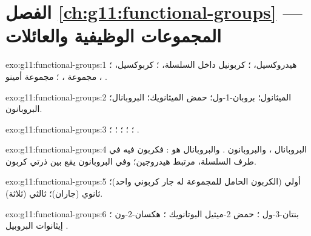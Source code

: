 \section*{الفصل \ref{ch:g11:functional-groups} --- المجموعات الوظيفية والعائلات}

\begin{solution}{exo:g11:functional-groups:1}
هيدروكسيل، ؛ كربونيل داخل السلسلة، ؛ كربوكسيل، ؛ مجموعة ، ؛ مجموعة أمينو ، .
\end{solution}

\begin{solution}{exo:g11:functional-groups:2}
الميثانول؛ بروبان-1-ول؛ حمض الميثانويك؛ البروبانال؛ البروبانون.
\end{solution}

\begin{solution}{exo:g11:functional-groups:3}
؛ ؛ ؛ ؛ ؛ .
\end{solution}

\begin{solution}{exo:g11:functional-groups:4}
البروبانال ، والبروبانون . والبروبانال هو
: فكربون  فيه في طرف السلسلة، مرتبط 
هيدروجين؛ وفي البروبانون يقع بين ذرتي كربون.
\end{solution}

\begin{solution}{exo:g11:functional-groups:5}
أولي (الكربون الحامل للمجموعة  له جار كربوني واحد)؛
ثانوي (جاران)؛ ثالثي (ثلاثة).
\end{solution}

\begin{solution}{exo:g11:functional-groups:6}
بنتان-3-ول ؛
حمض 2-ميثيل البوتانويك ؛
هكسان-2-ون ؛
إيثانوات البروبيل .
\end{solution}


